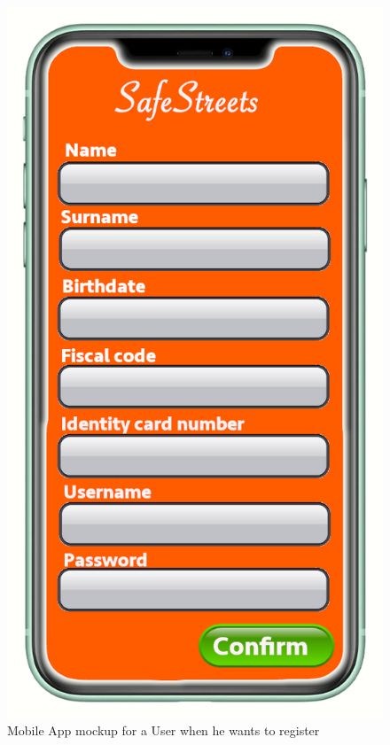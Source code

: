 \documentclass[a4paper]{report}
\begin{document}
{\begin{figure}
\begin{minipage}{.45\textwidth}
\includegraphics[width=.7\linewidth]{../RASD/img/mockups/Register.png}
\caption[Mobile App mockup for the registration]{Mobile App mockup for a User when he wants to register}
\label{fig:register-page}
\end{minipage}\hfill
\begin{minipage}{.45\textwidth}
\centering

\end{minipage}
\end{figure}}
\end{document}
